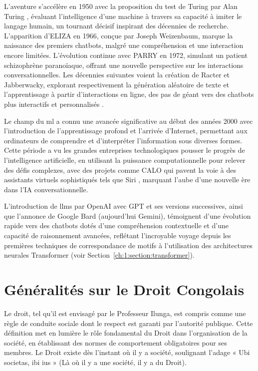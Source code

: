 L'aventure s'accélère en 1950 avec la proposition du test de Turing par Alan Turing \cite{turingTest}, évaluant l'intelligence d'une machine à travers sa capacité à imiter le langage humain, un tournant décisif inspirant des décennies de recherche. L'apparition d'ELIZA \cite{eliza1966} en 1966, conçue par Joseph Weizenbaum, marque la naissance des premiers chatbots, malgré une compréhension et une interaction encore limitées. L'évolution continue avec PARRY en 1972, simulant un patient schizophrène paranoïaque, offrant une nouvelle perspective sur les interactions conversationnelles. Les décennies suivantes voient la création de Racter et Jabberwacky, explorant respectivement la génération aléatoire de texte et l'apprentissage à partir d'interactions en ligne, des pas de géant vers des chatbots plus interactifs et personnalisés \cite{chatbotHistoryChatbots, Weizenbaum1966ELIZAaCP, alamin2024history}. 

Le champ du \ac{ml} a connu une avancée significative au début des années 2000 avec l'introduction de l'apprentissage profond et l'arrivée d'Internet, permettant aux ordinateurs de comprendre et d'interpréter l'information sous diverses formes. Cette période a vu les grandes entreprises technologiques pousser le progrès de l'intelligence artificielle, en utilisant la puissance computationnelle pour relever des défis complexes, avec des projets comme CALO qui pavent la voie à des assistants virtuels sophistiqués tels que Siri \cite{siri}, marquant l'aube d'une nouvelle ère dans l'IA conversationnelle.

L'introduction de \acfp{llm} par OpenAI avec GPT et ses versions successives, ainsi que l'annonce de Google Bard (aujourd'hui Gemini), témoignent d'une évolution rapide vers des chatbots dotés d'une compréhension contextuelle et d'une capacité de raisonnement avancées, reflétant l'incroyable voyage depuis les premières techniques de correspondance de motifs à l'utilisation des architectures neurales Transformer (voir Section~\ref{ch:1:section:transformer}).

\newpage
\section{Généralités sur le Droit Congolais}
\label{ch:1:section:introduction-law}

Le droit, tel qu'il est envisagé par le Professeur Ilunga, est compris comme une règle de conduite sociale dont le respect est garanti par l'autorité publique. Cette définition met en lumière le rôle fondamental du Droit dans l'organisation de la société, en établissant des normes de comportement obligatoires pour ses membres. Le Droit existe dès l'instant où il y a société, soulignant l'adage « Ubi societas, ibi ius » (Là où il y a une société, il y a du Droit).

